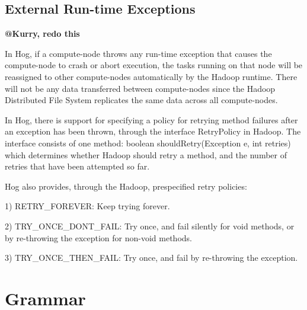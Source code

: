 \documentclass{article}
\begin{document}

\subsection{External Run-time Exceptions} %
\label{sub:external_run_time_exceptions}

\textbf{@Kurry, redo this}

In Hog, if a compute-node throws any run-time exception
that causes the compute-node to crash or abort execution,
the tasks running on that node will be reassigned to other
compute-nodes automatically by the Hadoop runtime. There
will not be any data transferred between compute-nodes since
the Hadoop Distributed File System replicates the same data
across all compute-nodes.

In Hog, there is support for specifying a policy for retrying
method failures after an exception has been thrown, through the
interface RetryPolicy in Hadoop. The interface consists of one 
method:
     boolean shouldRetry(Exception e, int retries)  
which determines whether Hadoop should retry a method, and the
number of retries that have been attempted so far.

Hog also provides, through the Hadoop, prespecified retry policies:

1) RETRY_FOREVER: Keep trying forever. 

2) TRY_ONCE_DONT_FAIL: Try once, and fail silently for void methods,
or by re-throwing the exception for non-void methods.

3) TRY_ONCE_THEN_FAIL: Try once, and fail by re-throwing the exception.





\section{Grammar} %
\label{sec:grammar}
\end{document}
